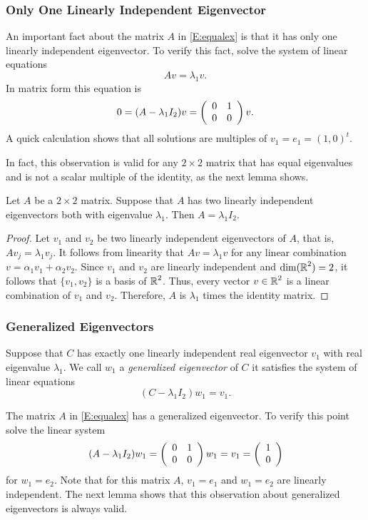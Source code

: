 \documentclass{ximera}
\begin{document}
\subsubsection*{Only One Linearly Independent Eigenvector}

An important fact about the matrix $A$ in \eqref{E:equalex} is that it has
only one linearly independent eigenvector.  To verify this fact, solve the
system of linear equations
\[
Av = \lambda_1v.
\]
In matrix form this equation is
\[
0 = (A-\lambda_1I_2)v = \left(\begin{array}{rr} 0 & 1\\ 0 &0\end{array}\right)v.
\]
A quick calculation shows that all solutions are multiples of
$v_1=e_1=(1,0)^t$.

In fact, this observation is valid for any $2\times 2$ matrix that has
equal eigenvalues and is not a scalar multiple of the identity, as the next
lemma shows.

\begin{lemma}  \label{L:1indeig}
Let $A$ be a $2\times 2$ matrix.  Suppose that $A$ has two linearly
independent eigenvectors both with eigenvalue $\lambda_1$.
Then $A=\lambda_1 I_2$.
\end{lemma}

\begin{proof}  Let $v_1$ and $v_2$ be two linearly independent
eigenvectors of $A$, that is, $Av_j = \lambda_1 v_j$.  It follows
from linearity that $Av=\lambda_1 v$ for any linear combination
$v=\alpha_1v_1+\alpha_2v_2$.  Since $v_1$ and $v_2$ are linearly
independent and $\dim(\mbox{$\Bbb{R}$}^2)=2$, it follows that $\{v_1,v_2\}$ is
a basis of $\mbox{$\Bbb{R}$}^2$.  Thus, every vector $v\in\mbox{$\Bbb{R}$}^2$ is a linear
combination of $v_1$ and $v_2$.  Therefore, $A$ is $\lambda_1$ times
the identity matrix.  \end{proof}

\subsubsection*{Generalized Eigenvectors}

Suppose that $C$ has exactly one linearly independent real eigenvector $v_1$
with real eigenvalue $\lambda_1$.  We call $w_1$ a {\em generalized
eigenvector\/} of $C$ it satisfies the
system of linear equations
\begin{equation} \label{e:Cw=lw+va}
(C-\lambda_1I_2)w_1 = v_1.
\end{equation}

The matrix $A$ in \eqref{E:equalex} has a generalized eigenvector. To verify
this point solve the linear system
\[
(A-\lambda_1I_2)w_1 = \left(\begin{array}{rr} 0 & 1\\ 0 &0\end{array}\right)w_1 = v_1 = \left(\begin{array}{r} 1 \\ 0\end{array}\right)
\]
for $w_1=e_2$.   Note that for this matrix $A$, $v_1=e_1$ and $w_1=e_2$ are
linearly independent.  The next lemma shows that this observation about
generalized eigenvectors is always valid.
\end{document}
